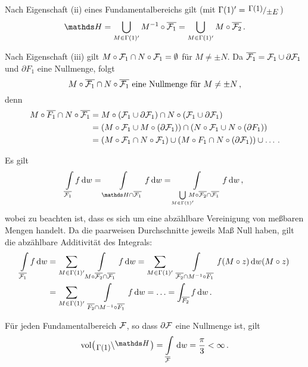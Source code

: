 \begin{bewe}
	Nach Eigenschaft (ii) eines Fundamentalbereichs gilt (mit $\Gamma(1)' = \modulo{\Gamma(1)}{\pm E}$)
	\[
	\HH = \bigcup_{M \in \Gamma(1)'} M^{-1} \circ \closure{\F_1} = \bigcup_{M \in \Gamma(1)'} M \circ \closure{\F_2}
	\,.
	\]
	
	Nach Eigenschaft (iii) gilt $M \circ \mathcal{F}_1 \cap N \circ \mathcal{F}_1 = \emptyset$ für $M \not= \pm N$.
	Da $\overline{\mathcal{F}_1} = \mathcal{F}_1 \cup \partial\mathcal{F}_1$ und $\partial F_1$ eine Nullmenge, folgt
	\[
	M \circ \overline{\mathcal{F}_1} \cap N\circ\overline{\mathcal{F}_1} \text{ eine Nullmenge für } M\not=\pm N
	\,,
	\]
	denn
	\begin{align*}
	M \circ \overline{F_1} \cap N \circ \overline{\mathcal{F}_1}
	&= M \circ (\mathcal{F}_1 \cup \partial \mathcal{F}_1) \cap N \circ (\mathcal{F}_1 \cup \partial \mathcal{F}_1) \\
	&= (M \circ \mathcal{F}_1 \cup M \circ (\partial \mathcal{F}_1)) \cap (N \circ \mathcal{F}_1 \cup N \circ (\partial F_1)) \\
	&= (M \circ \mathcal{F}_1 \cap N \circ \mathcal{F}_1) \cup (M \circ F_1 \cap N \circ (\partial \mathcal{F}_1)) \cup \ldots
	\,.
	\end{align*}
	
	Es gilt
	\[
	\int\limits_{\closure{\F_1}} f \opd w
	= \int\limits_{\HH \cap \closure{\F_1}} f \opd w
	= \int\limits_{\bigcup\limits_{M \in \Gamma(1)'} \!\!\!\!\!\! M \circ \closure{\F_2} \cap \closure{\F_1}} f \opd w
	\,,
	\]
	wobei zu beachten ist, dass es sich um eine abzählbare Vereinigung von meßbaren Mengen handelt. Da die paarweisen Durchschnitte jeweils Maß Null haben, gilt die abzählbare Additivität des Integrals:
	\begin{align*}
	\int\limits_{\overline{\mathcal{F}_1}} f \,\mathrm{d} w
	&= \sum_{M \in \Gamma(1)'} \int\limits_{M\circ \overline{\mathcal{F}_2} \cap \overline{\mathcal{F}_1}} f \,\mathrm{d} w
	= \sum_{M \in \Gamma(1)'} \ \int\limits_{\overline{\mathcal{F}_2} \cap M^{-1} \circ \overline{F_1}} f(M \circ z) \,\mathrm{d} w(M \circ z) \\
	&= \sum_{M \in \Gamma(1)'}\ \int\limits_{\overline{F_2} \cap M^{-1} \circ \overline{F_1}} f \,\mathrm{d} w
	= \ldots = \int_{\overline{F_2}} f\,\mathrm{d} w
	\,.
	\end{align*}
\end{bewe}

\begin{bsp}
	Für jeden Fundamentalbereich $\mathcal{F}$, so dass $\partial \mathcal{F}$ eine Nullmenge ist, gilt
	\[
	\vol\bigl(\linksmodulo{\Gamma(1)}\HH\bigr) = \int\limits_{\closure \F} \opd w = \frac{\pi}{3} < \infty
	\,.
	\]
\end{bsp}

